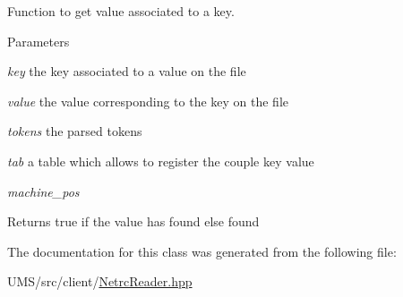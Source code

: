 Function to get value associated to a key. 


\begin{DoxyParams}{Parameters}
\item[{\em key}]the key associated to a value on the file \item[{\em value}]the value corresponding to the key on the file \item[{\em tokens}]the parsed tokens \item[{\em tab}]a table which allows to register the couple key value \item[{\em machine\_\-pos}]\end{DoxyParams}
\begin{DoxyReturn}{Returns}
true if the value has found else found 
\end{DoxyReturn}


The documentation for this class was generated from the following file:\begin{DoxyCompactItemize}
\item 
UMS/src/client/\hyperlink{NetrcReader_8hpp}{NetrcReader.hpp}\end{DoxyCompactItemize}
